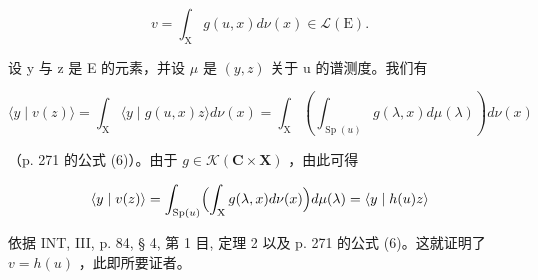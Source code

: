 \[
v = \int_ {\mathrm{X}} g (u, x) d \nu (x) \in \mathscr {L} (\mathrm{E}).
\]

设 y 与 z 是 E 的元素，并设 \(\mu\) 是 \((y, z)\) 关于 u 的谱测度。我们有

\[
\langle y \mid v (z) \rangle = \int_ {\mathrm{X}} \langle y \mid g (u, x) z \rangle d \nu (x) = \int_ {\mathrm{X}} \left(\int_ {\operatorname{Sp} (u)} g (\lambda , x) d \mu (\lambda)\right) d \nu (x)
\]

（p. 271 的公式 (6)）。由于 \(g \in \mathcal{K}(\mathbf{C} \times \mathbf{X})\) ，由此可得

\[
\langle y \mid v (z) \rangle = \int_ {\operatorname{Sp} (u)} \Bigl (\int_ {\mathrm{X}} g (\lambda , x) d \nu (x) \Bigr) d \mu (\lambda) = \langle y \mid h (u) z \rangle
\]

依据 INT, III, p. 84, § 4, 第 1 目, 定理 2 以及 p. 271 的公式 (6)。这就证明了 \(v = h(u)\) ，此即所要证者。

